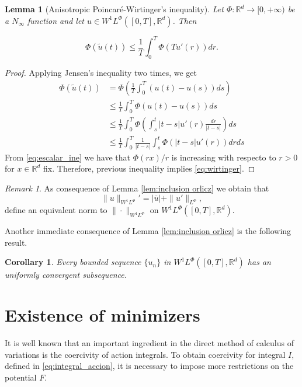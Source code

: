 \documentclass[twoside]{article}
\newtheorem{cor}[thm]{Corollary}
\newtheorem{lem}[thm]{Lemma}
\theoremstyle{remark}
\newtheorem{comentario}{Remark}
\newcommand{\orlnor}{\|_{L^{\Phi}}}
\newcommand{\lphi}{L^{\Phi}}
\newcommand{\wphi}{W^{1}\lphi}
\newcommand{\sobnor}{\|_{W^{1}\lphi}}
\newcommand{\rr}{\mathbb{R}}
\renewcommand{\leq}{\leqslant}
\begin{document}
\begin{lem}[Anisotropic Poincar\'e-Wirtinger's inequality]\label{lem:inclusion orliczII} Let $\Phi:\rr^d\to [0,+\infty)$ be a $N_{\infty}$
function and let $u\in\wphi\left([0,T],\rr^d\right)$. Then

\begin{equation}\label{eq:wirtinger}
  \Phi\left(\tilde{u}(t)\right)\leq\frac{1}{T} \int_0^T \Phi\left(Tu'(r)\right)dr.\tag{A.P-W.I}
\end{equation}

\end{lem}

\begin{proof}  Applying Jensen's inequality two times, we get
\begin{equation*}
\begin{split}
\Phi(\tilde{u}(t))&=\Phi\left(\frac{1}{T}\int_0^T \left(u(t)-u(s)\right) ds\right)\\
&\leq\frac{1}{T}\int_0^T \Phi(u(t)-u(s))ds\\
&\leq \frac{1}{T}\int_0^T \Phi\left(\int_s^t |t-s| u'(r)\frac{dr}{|t-s|}\right)ds\\
&\leq 
\frac{1}{T}\int_0^T \frac{1}{|t-s|} \int_s^t\Phi\left(|t-s| u'(r)\right)drds
\end{split}
\end{equation*}
From \eqref{eq:escalar_ine} we have that $\Phi(rx)/r$ is increasing with respecto to $r>0$ for $x\in\rr^d$ fix. Therefore, previous inequality  implies \eqref{eq:wirtinger}.
\end{proof}


\begin{comentario}\label{com:equiv-norm} As consequence of Lemma \ref{lem:inclusion orlicz} we obtain that 
  \[\|u\sobnor'=|\overline{u}|+\|u'\orlnor,\]
  define an equivalent norm to $\|\cdot\sobnor$ on $\wphi([0,T],\rr^d)$.   
\end{comentario}
Another immediate consequence of  Lemma \ref{lem:inclusion orlicz} is the following result.
 \begin{cor}\label{cor:unif_conv} Every bounded sequence $\{u_n\}$ in  $\wphi([0,T],\rr^d)$  has an uniformly convergent subsequence. 
\end{cor}

\section{Existence of minimizers}\label{sec:existencia}


It is well known that an important ingredient in the direct method of calculus of variations is the coercivity of action integrals. To obtain  coercivity for integral $I$, defined in  \eqref{eq:integral_accion}, it is necessary to impose more restrictions on the potential $F$.
\end{document}

